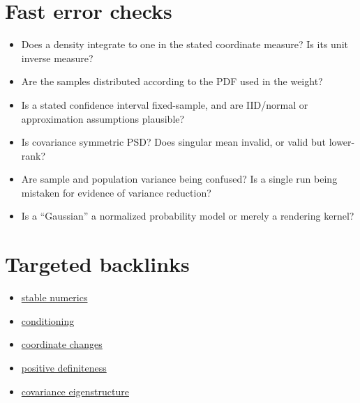 \section{Fast error checks}\label{appendix-cb5af353ef77-fast-error-checks}

\begin{itemize}
\tightlist
\item
  Does a density integrate to one in the stated coordinate measure? Is its unit inverse measure?
\item
  Are the samples distributed according to the PDF used in the weight?
\item
  Is a stated confidence interval fixed-sample, and are IID/normal or approximation assumptions plausible?
\item
  Is covariance symmetric PSD? Does singular mean invalid, or valid but lower-rank?
\item
  Are sample and population variance being confused? Is a single run being mistaken for evidence of variance reduction?
\item
  Is a ``Gaussian'' a normalized probability model or merely a rendering kernel?
\end{itemize}

\section{Targeted backlinks}\label{appendix-cb5af353ef77-targeted-backlinks}

\begin{itemize}
\tightlist
\item
  \href{Continuous\%20Notes/Computing\%20Foundations\%20-\%20From\%20Bits\%20to\%20C++\%20and\%20Systems\%20APIs\#A\%20direction\%20can\%20exist\%20even\%20when\%20the\%20naive\%20length\%20overflows}{stable numerics}
\item
  \href{Continuous\%20Notes/Computing\%20Foundations\%20-\%20From\%20Bits\%20to\%20C++\%20and\%20Systems\%20APIs\#An\%20inverse\%20can\%20exist\%20and\%20still\%20amplify\%20uncertainty}{conditioning}
\item
  \href{Continuous\%20Notes/Computing\%20Foundations\%20-\%20From\%20Bits\%20to\%20C++\%20and\%20Systems\%20APIs\#Coordinates\%20can\%20change\%20while\%20the\%20geometric\%20object\%20stays\%20still}{coordinate changes}
\item
  \href{Continuous\%20Notes/Computing\%20Foundations\%20-\%20From\%20Bits\%20to\%20C++\%20and\%20Systems\%20APIs\#Positive\%20definiteness\%20is\%20a\%20structural\%20promise}{positive definiteness}
\item
  \href{Continuous\%20Notes/Computing\%20Foundations\%20-\%20From\%20Bits\%20to\%20C++\%20and\%20Systems\%20APIs\#Diagonalization\%20leads\%20to\%20the\%20stronger\%20symmetric\%20spectral\%20theorem}{covariance eigenstructure}
\end{itemize}

